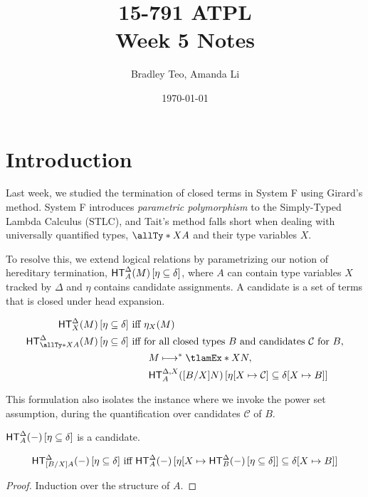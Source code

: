 \documentclass{article}
\title{15-791 ATPL \\ Week 5 Notes}
\author{Bradley Teo, Amanda Li}
\date{\today}
\newcommand{\HTg}[5]{\HT[#1]^{#2}(#3) \, [#4\subseteq #5]}
\begin{document}
\maketitle

\section{Introduction}

Last week, we studied the termination of closed terms in System F using Girard's method. System F introduces \emph{parametric polymorphism} to the Simply-Typed Lambda Calculus (STLC), and Tait's method falls short when dealing with universally quantified types, $\allTy*{X}{A}$ and their type variables $X$.

To resolve this, we extend logical relations by parametrizing our notion of hereditary termination, $\HTg{A}{\Delta}{M}{\eta}{\delta}$, where $A$ can contain type variables $X$ tracked by $\Delta$ and $\eta$ contains candidate assignments. A candidate is a set of terms that is closed under head expansion.

\begin{definition}
\begin{align*}
    \HTg{X}{\Delta}{M}{\eta}{\delta} &\text{ iff } \eta_X(M) \\
    \HTg{\allTy*{X}{A}}{\Delta}{M}{\eta}{\delta} &\text{ iff } \text{for all closed types $B$ and candidates $\mathcal{C}$ for $B$,} \\
    &\quad\quad M \longmapsto^* \tlamEx*{X}{N}, \\
    &\quad\quad \HTg{A}{\Delta, X}{[B/X]N}{\eta[X\mapsto\mathcal{C}]}{\delta[X\mapsto B]}
\end{align*}
\end{definition}
This formulation also isolates the instance where we invoke the power set assumption, during the quantification over candidates $\mathcal{C}$ of $B$.

\begin{lemma}
    $\HTg{A}{\Delta}{-}{\eta}{\delta}$ is a candidate.
\end{lemma}

\begin{lemma}[Compositionality]
    \[\HTg{[B/X]A}{\Delta}{-}{\eta}{\delta} \text{ iff } \HTg{A}{\Delta}{-}{\eta[X\mapsto \HTg{B}{\Delta}{-}{\eta}{\delta}]}{\delta[X\mapsto B]}\] 
\end{lemma}
\begin{proof}
    Induction over the structure of $A$.
\end{proof}
\end{document}
